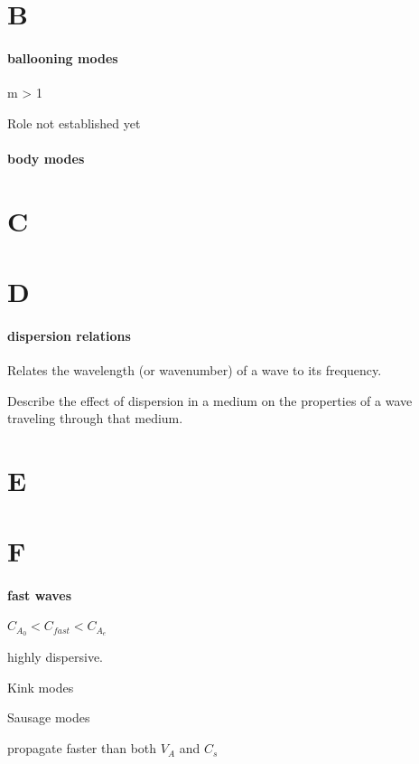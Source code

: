 \documentclass[12pt]{article}
\begin{document}
\section*{B}

\paragraph{ballooning modes}
\begin{itemize*}
    \item m > 1
    \item Role not established yet
\end{itemize*}

\paragraph{body modes}

\section*{C}

\section*{D}

\paragraph{dispersion relations}
\begin{itemize*}
    \item Relates the wavelength (or wavenumber) of a wave to its
        frequency.
    \item Describe the effect of dispersion in a medium on the properties
        of a wave traveling through that medium.
\end{itemize*}

\section*{E}

\section*{F}

\paragraph{fast waves}
\begin{itemize*}
    \item $C_{A_0} < C_{fast} < C_{A_e} $
    \item highly dispersive.
    \item Kink modes
    \item Sausage modes
    \item propagate faster than both $V_A$ and $C_s$
\end{itemize*}
\end{document}
